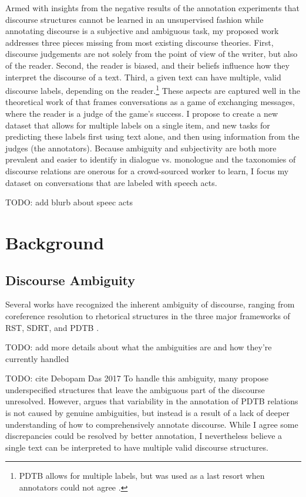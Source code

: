 Armed with insights from the negative results of the annotation experiments that discourse structures cannot be learned in an unsupervised fashion while annotating discourse is a subjective and ambiguous task, my proposed work addresses three pieces missing from most existing discourse theories. First, discourse judgements are not solely from the point of view of the writer, but also of the reader. Second, the reader is biased, and their beliefs influence how they interpret the discourse of a text. Third, a given text can have multiple, valid discourse labels, depending on the reader.\footnote{PDTB allows for multiple labels, but was used as a last resort when annotators could not agree \citep{Versley:2011}.} These aspects are captured well in the theoretical work of \citet{Asher:2018} that frames conversations as a game of exchanging messages, where the reader is a judge of the game's success. I propose to create a new dataset that allows for multiple labels on a single item, and new tasks for predicting these labels first using text alone, and then using information from the judges (the annotators). Because ambiguity and subjectivity are both more prevalent and easier to identify in dialogue vs. monologue and the taxonomies of discourse relations are onerous for a crowd-sourced worker to learn, I focus my dataset on conversations that are labeled with speech acts.

TODO: add blurb about speec acts

\section{Background}

\subsection{Discourse Ambiguity} Several works have recognized the inherent ambiguity of discourse, ranging from coreference resolution to rhetorical structures in the three major frameworks of RST, SDRT, and PDTB \citep{Poesio:2019,Das:2017,Asher:2003,Versley:2011}. 


TODO: add more details about what the ambiguities are and how they're currently handled 

TODO: cite Debopam Das 2017
To handle this ambiguity, many propose underspecified structures that leave the ambiguous part of the discourse unresolved. However, \citet{Webber:2012} argues that variability in the annotation of PDTB relations is not caused by genuine ambiguities, but instead is a result of a lack of deeper understanding of how to comprehensively annotate discourse. While I agree some discrepancies could be resolved by better annotation, I nevertheless believe a single text can be interpreted to have multiple valid discourse structures. 


